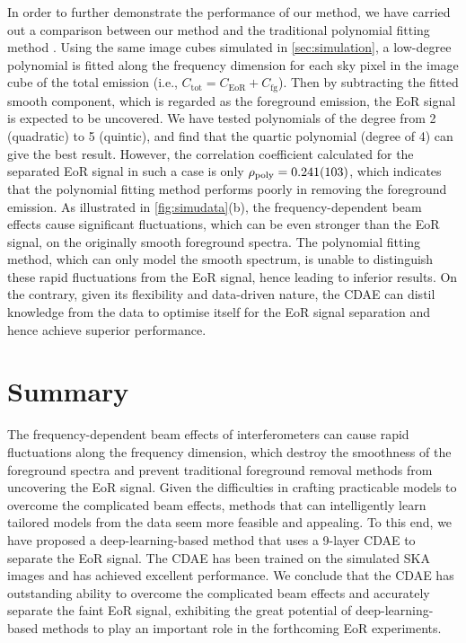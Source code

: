 \documentclass[fleqn,usenatbib]{mnras}
\newcommand{\R}[1]{\mathrm{#1}}
\begin{document}
In order to further demonstrate the performance of our method, we have
carried out a comparison between our method and the traditional polynomial
fitting method \citep[e.g.,][]{wang2006,liu2009ps}.
Using the same image cubes simulated in \autoref{sec:simulation},
a low-degree polynomial is fitted along the frequency dimension for each
sky pixel in the image cube of the total emission (i.e.,
$C_{\R{tot}} = C_{\R{EoR}} + C_{\R{fg}}$).
Then by subtracting the fitted smooth component, which is regarded as
the foreground emission, the EoR signal is expected to be uncovered.
We have tested polynomials of the degree from 2 (quadratic) to
5 (quintic), and find that the quartic polynomial (degree of 4)
can give the best result.
However, the correlation coefficient calculated for the separated EoR
signal in such a case is only $\rho_{\R{poly}} = \num{0.241 +- 0.103}$,
which indicates that the polynomial fitting method
performs poorly in removing the foreground emission.
As illustrated in \autoref{fig:simudata}(b), the frequency-dependent
beam effects cause significant fluctuations, which can be even stronger
than the EoR signal, on the originally smooth foreground spectra.
The polynomial fitting method, which can only model the smooth
spectrum, is unable to distinguish these rapid fluctuations from the
EoR signal, hence leading to inferior results.
On the contrary, given its flexibility and data-driven nature,
the CDAE can distil knowledge from the data to optimise itself for
the EoR signal separation and hence achieve superior performance.


\section{Summary}
\label{sec:summary}

The frequency-dependent beam effects of interferometers can cause
rapid fluctuations along the frequency dimension,
which destroy the smoothness of the foreground spectra and prevent
traditional foreground removal methods from uncovering the EoR signal.
Given the difficulties in crafting practicable models to overcome the
complicated beam effects, methods that can intelligently learn tailored
models from the data seem more feasible and appealing.
To this end, we have proposed a deep-learning-based method that uses
a 9-layer CDAE to separate the EoR signal.
The CDAE has been trained on the simulated SKA images and has achieved
excellent performance.
We conclude that the CDAE has outstanding ability to overcome the
complicated beam effects and accurately separate the faint EoR signal,
exhibiting the great potential of deep-learning-based methods
to play an important role in the forthcoming EoR experiments.
\end{document}
